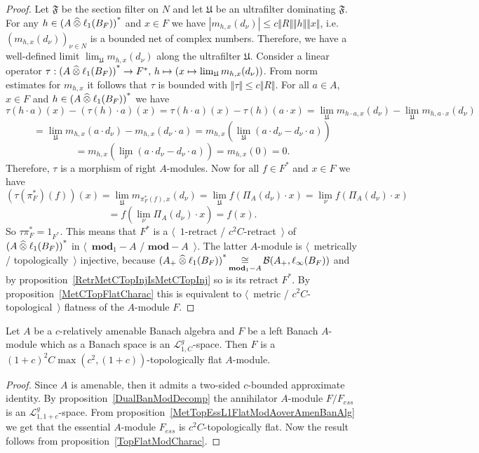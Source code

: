\begin{proof}
Let $\mathfrak{F}$ be the section filter on $N$ and let $\mathfrak{U}$ be an
ultrafilter dominating $\mathfrak{F}$. For any 
$h\in {(A\mathbin{\widehat{\otimes}}\ell_1(B_F))}^*$ and $x\in F$ we 
have $|m_{h,x}(d_\nu)|\leq c\Vert R\Vert\Vert h\Vert\Vert x\Vert$, 
i.e. ${(m_{h,x}(d_\nu))}_{\nu\in N}$ is a
bounded net of complex numbers. Therefore, we have a well-defined limit
$\lim_{\mathfrak{U}}m_{h,x}(d_\nu)$ along the ultrafilter $\mathfrak{U}$. 
Consider a linear operator 
$\tau:
{(A\mathbin{\widehat{\otimes}}\ell_1(B_F))}^*\to F^*,\, 
h\mapsto(x\mapsto\lim_{\mathfrak{U}}m_{h,x}(d_\nu))$. From 
norm estimates for $m_{h,x}$ it follows that $\tau$ is bounded 
with $\Vert\tau\Vert\leq c\Vert R\Vert$. For all $a\in A$, $x\in F$ 
and $h\in {(A\mathbin{\widehat{\otimes}}\ell_1(B_F))}^*$ we have
$$
\tau(h\cdot a)(x)-(\tau(h)\cdot a)(x)
=\tau(h\cdot a)(x)-\tau(h)(a\cdot x)
=\lim_{\mathfrak{U}}m_{h\cdot a,x}(d_\nu)
-\lim_{\mathfrak{U}}m_{h,a\cdot x}(d_\nu)
$$
$$
=\lim_{\mathfrak{U}}m_{h,x}(a\cdot d_\nu)-m_{h,x}(d_\nu\cdot a)
=m_{h,x}\left(\lim_{\mathfrak{U}}(a\cdot d_\nu-d_\nu\cdot a)\right)
$$
$$
=m_{h,x}\left(\lim_{\nu}(a\cdot d_\nu-d_\nu\cdot a)\right)
=m_{h,x}(0)
=0.
$$
Therefore, $\tau$ is a morphism of right $A$-modules. Now for all $f\in F^*$ and
$x\in F$ we have
$$
(\tau(\pi_F^*)(f))(x)
=\lim_{\mathfrak{U}}m_{\pi_F^*(f),x}(d_\nu)
=\lim_{\mathfrak{U}}f(\Pi_A(d_\nu)\cdot x)
=\lim_{\nu}f(\Pi_A(d_\nu)\cdot x)
$$
$$
=f\left(\lim_{\nu}\Pi_A(d_\nu)\cdot x\right)
=f(x).
$$
So $\tau\pi_F^*=1_{F^*}$. This means that $F^*$ is a $\langle$~$1$-retract /
 $c^2 C$-retract~$\rangle$ of ${(A\mathbin{\widehat{\otimes}}\ell_1(B_F))}^*$ in
 $\langle$~$\mathbf{mod}_1-A$ / $\mathbf{mod}-A$~$\rangle$. The latter
 $A$-module is $\langle$~metrically / topologically~$\rangle$ injective, because
 ${(A_+\mathbin{\widehat{\otimes}}\ell_1(B_F))}^*
 \mathop{\mathbin{\cong}}\limits_{\mathbf{mod}_1-A}
 \mathcal{B}(A_+,\ell_\infty(B_F))$
 and by proposition~\ref{RetrMetCTopInjIsMetCTopInj} so is its 
 retract $F^*$. By proposition~\ref{MetCTopFlatCharac} this is equivalent 
 to $\langle$~metric / $c^2 C$-topological~$\rangle$ flatness of the $A$-module $F$.
\end{proof}

\begin{theorem}\label{TopL1FlatModAoverAmenBanAlg} Let $A$ be a $c$-relatively
amenable Banach algebra and $F$ be a left Banach $A$-module which as a Banach
space is an $\mathscr{L}_{1, C}^g$-space. Then $F$ is a
${(1+c)}^2C\max(c^2,(1+c))$-topologically flat $A$-module.
\end{theorem}
\begin{proof} Since $A$ is amenable, then it admits a two-sided $c$-bounded
approximate identity. By proposition~\ref{DualBanModDecomp} the annihilator
$A$-module $F/F_{ess}$ is an $\mathscr{L}_{1,1+c}^g$-space. From
proposition~\ref{MetTopEssL1FlatModAoverAmenBanAlg} we get that the essential
$A$-module $F_{ess}$ is $c^2 C$-topologically flat. Now the result follows from
proposition~\ref{TopFlatModCharac}.
\end{proof}

